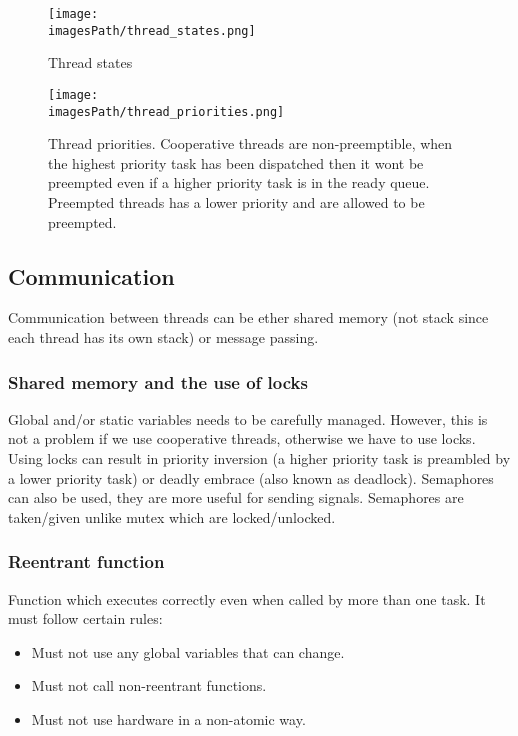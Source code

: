 \begin{figure}[H]
    \centering
    \texttt{[image: \\imagesPath/thread\_states.png]}
    \caption{Thread states}
    \label{fig:thread_states}
\end{figure}

\begin{figure}[H]
    \centering
    \texttt{[image: \\imagesPath/thread\_priorities.png]}
    \caption{Thread priorities. Cooperative threads are non-preemptible, 
    when the highest priority task has been dispatched then it wont be preempted 
    even if a higher priority task is in the ready queue. Preempted threads 
    has a lower priority and are allowed to be preempted.}
    \label{fig:thread_priorities}
\end{figure}


\subsection{Communication}
Communication between threads can be ether shared memory (not stack since each thread has its own stack)
or message passing. 

\subsubsection{Shared memory and the use of locks}
Global and/or static variables needs to be carefully managed.
However, this is not a problem if we use cooperative threads, otherwise we have to use locks. 
Using locks can result in priority inversion (a higher priority task is preambled by a lower priority task) 
or deadly embrace (also known as deadlock).
Semaphores can also be used, they are more useful for sending signals.
Semaphores are taken/given unlike mutex which are locked/unlocked.

\subsubsection{Reentrant function}
Function which executes correctly even when called by more than one task.
It must follow certain rules:
\begin{itemize}
    \item Must not use any global variables that can change.
    \item Must not call non-reentrant functions.
    \item Must not use hardware in a non-atomic way.
\end{itemize}

